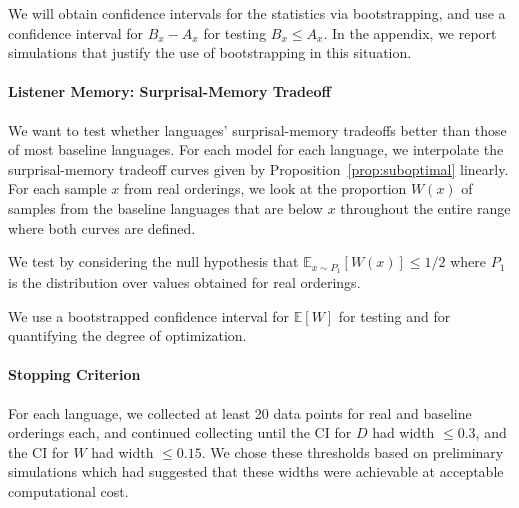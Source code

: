 \documentclass[11pt,letterpaper]{article}
\newcommand{\E}[0]{\mathbb{E}}
\begin{document}
We will obtain confidence intervals for the statistics via bootstrapping, and use a confidence interval for $B_x-A_x$ for testing $B_x \leq A_x$.
In the appendix, we report simulations that justify the use of bootstrapping in this situation.

\paragraph{Listener Memory: Surprisal-Memory Tradeoff}
We want to test whether languages' surprisal-memory tradeoffs better than those of most baseline languages.
For each model for each language, we interpolate the surprisal-memory tradeoff curves given by Proposition~\ref{prop:suboptimal} linearly.
For each sample $x$ from real orderings, we look at the proportion $W(x)$ of samples from the baseline languages that are below $x$ throughout the entire range where both curves are defined.

We test by considering the null hypothesis that $\E_{x \sim P_1}[W(x)] \leq 1/2$ where $P_1$ is the distribution over values obtained for real orderings.

We use a bootstrapped confidence interval for $\E[W]$ for testing and for quantifying the degree of optimization.

%


\paragraph{Stopping Criterion}

For each language, we collected at least 20 data points for real and baseline orderings each, and continued collecting until the CI for $D$ had width $\leq 0.3$, and the CI for $W$ had width $\leq 0.15$.
We chose these thresholds based on preliminary simulations which had suggested that these widths were achievable at acceptable computational cost.

%



%
%
\end{document}
